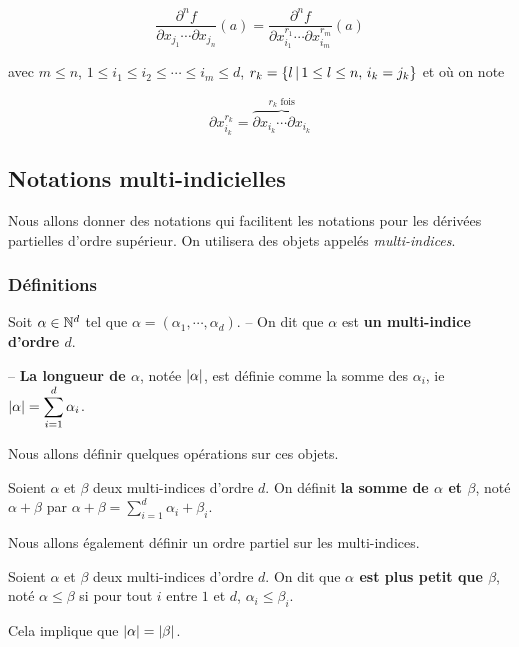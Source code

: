 \begin{equation*}
	\frac{\partial^{n} f}{\partial x_{j_{1}} \cdots \partial x_{j_{n}}} (a) =
	\frac{\partial^{n} f}{\partial x_{i_{1}}^{r_{1}} \cdots \partial
	x_{i_{m}}^{r_{m}}} (a)
\end{equation*}

avec $m \leq n$, $1 \leq i_{1} \leq i_{2} \leq \cdots \leq i_{m} \leq d$, $r_{k}
= \left\{l \, | \, 1 \leq l \leq n, \, i_{k} = j_{k} \right\}$ et où on note

\begin{equation*}
	\partial x_{i_{k}}^{r_{k}} = \overbrace{\partial x_{i_{k}} \cdots \partial
	x_{i_{k}}}^{r_{k} \text{ fois}}
\end{equation*}

\subsection{Notations multi-indicielles}

Nous allons donner des notations qui facilitent les notations pour les dérivées
partielles d'ordre supérieur. On utilisera des objets appelés
\textit{multi-indices}.

\subsubsection{Définitions}

\begin{definition} 
	Soit $\alpha \in \mathbb{N}^{d}$ tel que $\alpha = (\alpha_{1}, \cdots,
	\alpha_{d})$.
	-- On dit que $\alpha$ est \textbf{un multi-indice d'ordre $d$}.

	-- \textbf{La longueur de $\alpha$}, notée $|\alpha|$, est définie
	comme la somme des $\alpha_{i}$, ie $|\alpha| = \displaystyle
	\sum_{i = 1}^{d} \alpha_{i}$.
\end{definition}

Nous allons définir quelques opérations sur ces objets.

\begin{definition} 
	Soient $\alpha$ et $\beta$ deux multi-indices d'ordre $d$.
	On définit \textbf{la somme de $\alpha$ et $\beta$}, noté $\alpha + \beta$
	par $\alpha + \beta = \displaystyle \sum_{i = 1}^{d} \alpha_{i} +
	\beta_{i}$.
\end{definition}

Nous allons également définir un ordre partiel sur les multi-indices.

\begin{definition} 
	Soient $\alpha$ et $\beta$ deux multi-indices d'ordre $d$.
	On dit que \textbf{$\alpha$ est plus petit que $\beta$}, noté $\alpha \leq \beta$ si
	pour tout $i$ entre $1$ et $d$, $\alpha_{i} \leq \beta_{i}$.

	Cela implique que $|\alpha| = |\beta|$.
\end{definition}

